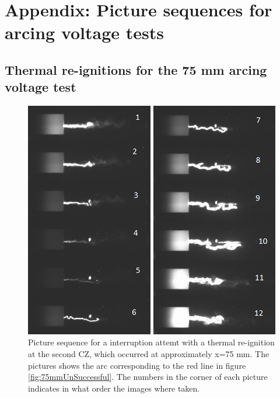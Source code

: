 \documentclass[10pt,b5paper,twoside]{article}
\begin{document}
\cleardoublepage

\section{Appendix: Picture sequences for arcing voltage tests} \label{app:pictureSeq75mm} %
\setcounter{figure}{0}
\setcounter{table}{0}
\makeatletter 
\renewcommand{\thefigure}{B.\@arabic\c@figure}
\makeatother

\makeatletter 
\renewcommand{\thetable}{B.\@arabic\c@table}
\makeatother

\subsection{Thermal re-ignitions for the 75 mm arcing voltage test}
\begin{figure}[H]
\centering
\includegraphics[scale=0.7, angle =0 ]{Bilder/Results/073_75_TR_TR.png}
\caption{Picture sequence for a interruption attemt with a thermal re-ignition at the second CZ, which occurred at approximately x=75 mm. The pictures shows the arc corresponding to the red line in figure \ref{fig:75mmUnSuccessful}. The numbers in the corner of each picture indicates in what order the images where taken.} \label{fig:arcingVoltage_test_73_red_TR}
\end{figure}
\end{document}
